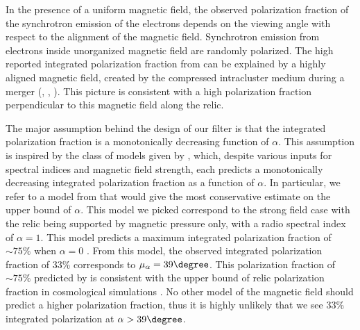 In the presence of a uniform magnetic field, the observed polarization
fraction of the synchrotron emission of the electrons depends on the
viewing angle with respect to the alignment of the magnetic field. 
Synchrotron emission from electrons inside unorganized magnetic field are
randomly polarized. The high reported integrated polarization fraction from
\citet{L13} can be explained by a highly aligned magnetic field,
created by the compressed intracluster medium during a merger
(\citealt{E98}, \citealt{vanWeeren10}, \citealt{Feretti12}).
This picture is consistent with a high polarization fraction perpendicular
to this magnetic field along the relic. 
\par
The major assumption behind the design of our filter
is that the integrated polarization fraction is a monotonically
decreasing function of $\alpha$. 
This assumption is inspired by the class of models given by \cite{E98}, 
which, despite various inputs for spectral indices and magnetic field strength, each predicts a monotonically decreasing integrated
polarization fraction as a function of $\alpha$. 
In particular, we refer to a model from \cite{E98} that would give the most
conservative estimate on the upper bound of $\alpha$. This model we picked
correspond to the strong field case with the relic being supported by
magnetic pressure only, with a radio spectral index of $\alpha = 1$. 
This model predicts a maximum integrated polarization fraction of
$\sim75\%$ when $\alpha = 0$ . From this model, the observed integrated
polarization fraction of 33\% corresponds to $\mu_\alpha =  39\degree$. 
This  polarization fraction of $\sim 75\%$ predicted by \citep{E98} is
consistent with the upper bound of relic polarization fraction in cosmological
simulations \citep{S13}. No other model of the magnetic field should predict a higher polarization fraction, thus it is highly unlikely that we see 33\%
integrated polarization at $\alpha > 39\degree$.  
\par

